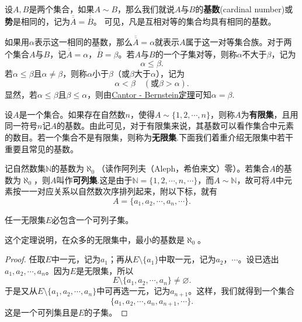 \documentclass[lang=cn,newtx,10pt,scheme=chinese]{../Template/elegantbook}
\begin{document}
\begin{definition}[集合的基数(或势)]\label{definition:集合的基数(或势)}
  设\(A,B\)是两个集合，如果\(A\sim B\)，那么我们就说\(A\)与\(B\)的\textbf{基数}(cardinal number)或\textbf{势}是相同的，记为\(\overline{\overline{A}}=\overline{\overline{B}}\)。
  可见，凡是互相对等的集合均具有相同的基数。
  
  如果用\(\alpha\)表示这一相同的基数，那么\(\overline{\overline{A}}=\alpha\)就表示\(A\)属于这一对等集合族。对于两个集合\(A\)与\(B\)，记\(\overline{\overline{A}}=\alpha\)，\(\overline{\overline{B}}=\beta\)。若\(A\)与\(B\)的一个子集对等，则称\(\alpha\)不大于\(\beta\)，记为
\[\alpha\leqslant\beta.\]
若\(\alpha\leqslant\beta\)且\(\alpha\neq\beta\)，则称\(\alpha\)小于\(\beta\)（或\(\beta\)大于\(\alpha\)），记为
\[\alpha<\beta\quad(\text{或}\beta>\alpha).\]
显然，若\(\alpha\leqslant\beta\)且\(\beta\leqslant\alpha\)，则由\hyperref[theorem:Cantor - Bernstein定理]{Cantor - Bernstein定理}可知\(\alpha=\beta\).
\end{definition}

\begin{definition}[有限集与无限集]\label{definition:有限集与无限集}
设\(A\)是一个集合。如果存在自然数\(n\)，使得\(A\sim\{1,2,\cdots,n\}\)，则称\(A\)为\textbf{有限集}，且用同一符号\(n\)记\(A\)的基数。由此可见，对于有限集来说，其基数可以看作集合中元素的数目。若一个集合不是有限集，则称为\textbf{无限集}.下面我们着重介绍无限集中若干重要且常见的基数。
\end{definition}

\begin{definition}\label{definition:自然数集的基数·可列集}
记自然数集\(\mathbb{N}\)的基数为\(\aleph_0\)（读作阿列夫（Aleph，希伯来文）零）。若集合\(A\)的基数为\(\aleph_0\)，则\(A\)叫作\textbf{可列集}.这是由于\(\mathbb{N}=\{1,2,\cdots,n,\cdots\}\)，而\(A\sim\mathbb{N}\)，故可将\(A\)中元素按一一对应关系以自然数次序排列起来，附以下标，就有
\[A = \{a_1,a_2,\cdots,a_n,\cdots\}.\]
\end{definition}

\begin{theorem}\label{theorem:任一无限集必包含一个可列子集}
任一无限集\(E\)必包含一个可列子集。
\end{theorem}
\begin{note}
  这个定理说明，在众多的无限集中，最小的基数是\(\aleph_0\)。
\end{note}
\begin{proof}
  任取\(E\)中一元，记为\(a_1\)；再从\(E\setminus\{a_1\}\)中取一元，记为\(a_2\)，\(\cdots\)。设已选出\(a_1,a_2,\cdots,a_n\)。因为\(E\)是无限集，所以
\[E\setminus\{a_1,a_2,\cdots,a_n\} \neq \varnothing.\]
于是又从\(E\setminus\{a_1,a_2,\cdots,a_n\}\)中可再选一元，记为\(a_{n + 1}\)。这样，我们就得到一个集合
\[\{a_1,a_2,\cdots,a_n,a_{n + 1},\cdots\}.\]
这是一个可列集且是\(E\)的子集。

\end{proof}
\end{document}
